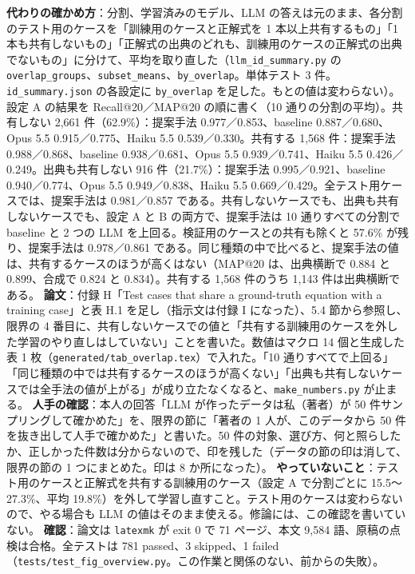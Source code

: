 \documentclass[11pt,a4paper]{jsarticle}
\begin{document}
\begin{itemize}[nosep]
    \textbf{代わりの確かめ方}：分割、学習済みのモデル、LLM の答えは元のまま、各分割のテスト用のケースを「訓練用のケースと正解式を 1 本以上共有するもの」「1 本も共有しないもの」「正解式の出典のどれも、訓練用のケースの正解式の出典でないもの」に分けて、平均を取り直した（\texttt{llm\_id\_summary.py} の \texttt{overlap\_groups}、\texttt{subset\_means}、\texttt{by\_overlap}。単体テスト 3 件。\texttt{id\_summary.json} の各設定に \texttt{by\_overlap} を足した。もとの値は変わらない）。設定 A の結果を Recall@20／MAP@20 の順に書く（10 通りの分割の平均）。共有しない 2,661 件（62.9\%）：提案手法 0.977／0.853、baseline 0.887／0.680、Opus 5.5 0.915／0.775、Haiku 5.5 0.539／0.330。共有する 1,568 件：提案手法 0.988／0.868、baseline 0.938／0.681、Opus 5.5 0.939／0.741、Haiku 5.5 0.426／0.249。出典も共有しない 916 件（21.7\%）：提案手法 0.995／0.921、baseline 0.940／0.774、Opus 5.5 0.949／0.838、Haiku 5.5 0.669／0.429。全テスト用ケースでは、提案手法は 0.981／0.857 である。共有しないケースでも、出典も共有しないケースでも、設定 A と B の両方で、提案手法は 10 通りすべての分割で baseline と 2 つの LLM を上回る。検証用のケースとの共有も除くと 57.6\% が残り、提案手法は 0.978／0.861 である。同じ種類の中で比べると、提案手法の値は、共有するケースのほうが高くはない（MAP@20 は、出典横断で 0.884 と 0.899、合成で 0.824 と 0.834）。共有する 1,568 件のうち 1,143 件は出典横断である。
    \textbf{論文}：付録 H「Test cases that share a ground-truth equation with a training case」と表 H.1 を足し（指示文は付録 I になった）、5.4 節から参照し、限界の 4 番目に、共有しないケースでの値と「共有する訓練用のケースを外した学習のやり直しはしていない」ことを書いた。数値はマクロ 14 個と生成した表 1 枚（\texttt{generated/tab\_overlap.tex}）で入れた。「10 通りすべてで上回る」「同じ種類の中では共有するケースのほうが高くない」「出典も共有しないケースでは全手法の値が上がる」が成り立たなくなると、\texttt{make\_numbers.py} が止まる。
    \textbf{人手の確認}：本人の回答「LLM が作ったデータは私（著者）が 50 件サンプリングして確かめた」を、限界の節に「著者の 1 人が、このデータから 50 件を抜き出して人手で確かめた」と書いた。50 件の対象、選び方、何と照らしたか、正しかった件数は分からないので、印を残した（データの節の印は消して、限界の節の 1 つにまとめた。印は 8 か所になった）。
    \textbf{やっていないこと}：テスト用のケースと正解式を共有する訓練用のケース（設定 A で分割ごとに 15.5〜27.3\%、平均 19.8\%）を外して学習し直すこと。テスト用のケースは変わらないので、やる場合も LLM の値はそのまま使える。修論には、この確認を書いていない。
    \textbf{確認}：論文は \texttt{latexmk} が exit 0 で 71 ページ、本文 9,584 語、原稿の点検は合格。全テストは 781 passed、3 skipped、1 failed（\texttt{tests/test\_fig\_overview.py}。この作業と関係のない、前からの失敗）。

\end{itemize}
\end{document}
